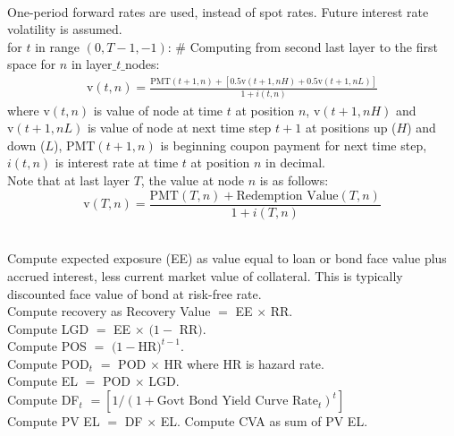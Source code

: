 \begin{method} \\
One-period forward rates are used, instead of spot rates. Future interest rate volatility is assumed.\\
for $t$ in range $(0, T-1, -1)$: \# Computing from second last layer to the first \\
{\color{white}space} for $n$ in layer$\_t\_$nodes:
\begin{align}
\text{v}(t,n) = \frac{\text{PMT}(t+1,n)+ [0.5 \text{v}(t+1, nH) + 0.5 \text{v}(t+1, nL)]}{1 + i(t, n)} \nonumber
\end{align}
where $\text{v}(t,n)$ is value of node at time $t$ at position $n$, $\text{v}(t+1,nH)$ and $\text{v}(t+1,nL)$ is value of node at next time step $t+1$ at positions up ($H$) and down ($L$), $\text{PMT}(t+1,n)$ is beginning coupon payment for next time step, $i(t,n)$ is interest rate at time $t$ at position $n$ in decimal. \\
Note that at last layer $T$, the value at node $n$ is as follows:
\begin{equation}
\text{v}(T, n) = \frac{\text{PMT}(T,n) + \text{Redemption Value}(T,n)}{1 + i(T, n)} \nonumber
\end{equation}
\end{method}

\begin{method} 
\label{method:computingcva}
\\
Compute expected exposure (EE) as value equal to loan or bond face value plus accrued interest, less current market value of collateral. This is typically discounted face value of bond at risk-free rate.\\
Compute recovery as Recovery Value $=$ EE $\times$ RR.\\
Compute LGD $=$ EE $\times$ $(1-$ RR$)$.\\
Compute POS $=$ $(1-$HR$)^{t-1}$.\\
Compute POD$_t$ $=$ POD $\times$ HR where HR is hazard rate.\\
Compute EL $=$ POD $\times$ LGD. \\
Compute DF$_t$ $= [1/(1+\text{Govt Bond Yield Curve Rate}_t)^t]$ \\
Compute PV EL $=$ DF $\times$ EL. Compute CVA as sum of PV EL.
\end{method}

